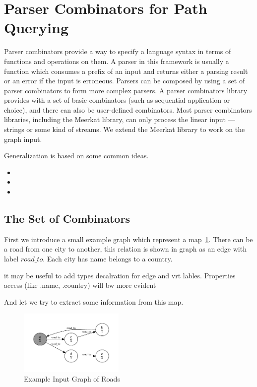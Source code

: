  \section{Parser Combinators for Path Querying}

Parser combinators provide a way to specify a language syntax in terms of functions and operations on them. 
A parser in this framework is usually a function which consumes a prefix of an input and returns either a parsing result or an error if the input is erroneous. 
Parsers can be composed by using a set of parser combinators to form more complex parsers. 
A parser combinators library provides with a set of basic combinators (such as sequential application or choice), and there can also be user-defined combinators. 
Most parser combinators libraries, including the Meerkat library, can only process the linear input --- strings or some kind of streams. 
We extend the Meerkat library to work on the graph input.

Generalization is based on some common ideas.
\begin{itemize}
\item  
\item 
\item 
\end{itemize}


\subsection{The Set of Combinators}

First we introduce a small example graph which represent a map~\ref{fig:graph}.
There can be a road from one city to another, this relation is shown in graph as an edge with label $road\_to$.
Each city has name belongs to a country. 

{it may be useful to add types decalration for edge and vrt lables. Properties access (like .name, .country) will bw more evident}

And let we try to extract some information from this map.

\begin{figure}[h]
\includegraphics[width=0.45\textwidth]{graph}
\caption{Example Input Graph of Roads}
\label{fig:graph}
\end{figure}

